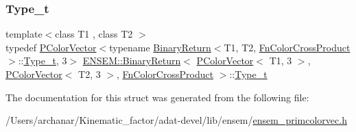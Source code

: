 \subsubsection{\texorpdfstring{Type\_t}{Type\_t}\hspace{0.1cm}{\footnotesize\ttfamily [3/3]}}
{\footnotesize\ttfamily template$<$class T1 , class T2 $>$ \\
typedef \mbox{\hyperlink{classENSEM_1_1PColorVector}{P\+Color\+Vector}}$<$typename \mbox{\hyperlink{structENSEM_1_1BinaryReturn}{Binary\+Return}}$<$T1, T2, \mbox{\hyperlink{structENSEM_1_1FnColorCrossProduct}{Fn\+Color\+Cross\+Product}}$>$\+::\mbox{\hyperlink{structENSEM_1_1BinaryReturn_3_01PColorVector_3_01T1_00_013_01_4_00_01PColorVector_3_01T2_00_013_ba40478e41b9dc719d7fd5b6b54bac05_a1ee2bf6b3057b787867e31a8bafe80a6}{Type\+\_\+t}}, 3$>$ \mbox{\hyperlink{structENSEM_1_1BinaryReturn}{E\+N\+S\+E\+M\+::\+Binary\+Return}}$<$ \mbox{\hyperlink{classENSEM_1_1PColorVector}{P\+Color\+Vector}}$<$ T1, 3 $>$, \mbox{\hyperlink{classENSEM_1_1PColorVector}{P\+Color\+Vector}}$<$ T2, 3 $>$, \mbox{\hyperlink{structENSEM_1_1FnColorCrossProduct}{Fn\+Color\+Cross\+Product}} $>$\+::\mbox{\hyperlink{structENSEM_1_1BinaryReturn_3_01PColorVector_3_01T1_00_013_01_4_00_01PColorVector_3_01T2_00_013_ba40478e41b9dc719d7fd5b6b54bac05_a1ee2bf6b3057b787867e31a8bafe80a6}{Type\+\_\+t}}}



The documentation for this struct was generated from the following file\+:\begin{DoxyCompactItemize}
\item 
/\+Users/archanar/\+Kinematic\+\_\+factor/adat-\/devel/lib/ensem/\mbox{\hyperlink{adat-devel_2lib_2ensem_2ensem__primcolorvec_8h}{ensem\+\_\+primcolorvec.\+h}}\end{DoxyCompactItemize}
